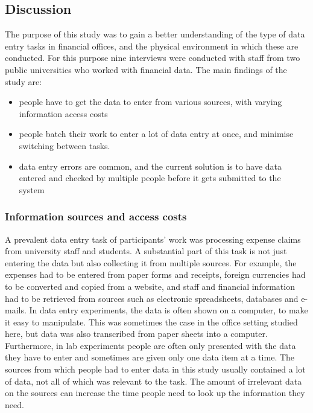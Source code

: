 \documentclass[11pt,oneside]{report}
\begin{document}
\pagebreak

\subsection{Discussion}
The purpose of this study was to gain a better understanding of the type of data entry tasks in financial offices, and the physical environment in which these are conducted. For this purpose nine interviews were conducted with staff from two public universities who worked with financial data. The main findings of the study are: 

\begin{itemize}
\item 
people have to get the data to enter from various sources, with varying information access costs
\item 
people batch their work to enter a lot of data entry at once, and minimise switching between tasks. 
\item 
data entry errors are common, and the current solution is to have data entered and checked by multiple people before it gets submitted to the system
\end{itemize}

\subsubsection{Information sources and access costs}
A prevalent data entry task of participants' work was processing expense claims from university staff and students. A substantial part of this task is not just entering the data but also collecting it from multiple sources. For example, the expenses had to be entered from paper forms and receipts, foreign currencies had to be converted and copied from a website, and staff and financial information had to be retrieved from sources such as electronic spreadsheets, databases and e-mails. 
In data entry experiments, the data is often shown on a computer, to make it easy to manipulate. This was sometimes the case in the office setting studied here, but data was also transcribed from paper sheets into a computer. Furthermore, in lab experiments people are often only presented with the data they have to enter and sometimes are given only one data item at a time. The sources from which people had to enter data in this study usually contained a lot of data, not all of which was relevant to the task. The amount of irrelevant data on the sources can increase the time people need to look up the information they need.
\end{document}
